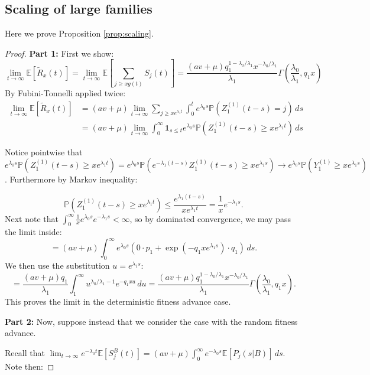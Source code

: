 \documentclass{article}
\numberwithin{equation}{section}
\begin{document}
\subsection{Scaling of large families}\label{app:scaling}
Here we prove Proposition \ref{prop:scaling}.
\Scaling*
\begin{proof}
    \textbf{Part 1: }First we show:
    \[\lim_{t\to\infty}\mathbb{E}\left[\widetilde{R}_x(t)\right]=\lim_{t\to\infty}\mathbb{E}\left[\sum_{j\geq xg(t)}S_j(t)\right]=\frac{(av+\mu) q_1^{1-\lambda_0/\lambda_1}x^{-\lambda_0/\lambda_1}}{\lambda_1}\Gamma(\frac{\lambda_0}{\lambda_1},q_1 x)\]
    By Fubini-Tonnelli applied twice:
  \begin{align*}
    \lim_{t\to\infty}\mathbb{E}[\widetilde{R}_x(t)]&=(av+\mu)\lim_{t\to\infty}\sum_{j\geq xe^{\lambda_1 t}}\int_0^t e^{\lambda_0 s}\mathbb{P}(Z_1^{(1)}(t-s)=j)\,ds\\
    &=(av+\mu)\lim_{t\to\infty}\int_0^\infty \mathbf{1}_{s\leq t} e^{\lambda_0 s}\mathbb{P}(Z_1^{(1)}(t-s)\geq xe^{\lambda_1 t})\,ds
  \end{align*}

Notice pointwise that $e^{\lambda_0 s} \mathbb{P}(Z_1^{(1)}(t-s)\geq x e^{\lambda_1 t})=e^{\lambda_0 s} \mathbb{P}(e^{-\lambda_1 (t-s)}Z_1^{(1)}(t-s)\geq x e^{\lambda_1 s})\to e^{\lambda_0 s}\mathbb{P}(Y_1^{(1)}\geq x e^{\lambda_1 s})$. Furthermore by Markov inequality:

\[\mathbb{P}(Z_1^{(1)}(t-s)\geq xe^{\lambda_1 t})\leq \frac{e^{\lambda_1(t-s)}}{x e^{\lambda_1 t}}=\frac{1}{x}e^{-\lambda_1 s}.\]
Next note that $\int_0^\infty \frac{1}{x}e^{\lambda_0 s}e^{-\lambda_1 s}<\infty$, so by dominated convergence, we may pass the limit inside:
\[
=(av+\mu)\int_0^\infty e^{\lambda_0 s}(0\cdot p_1+\exp(-q_1 xe^{\lambda_1 s})\cdot q_1)\,ds.
\]
We then use the substitution $u=e^{\lambda_1 s}$:
\[
=\frac{(av+\mu)q_1}{\lambda_1}\int_1^\infty u^{\lambda_0/\lambda_1-1}e^{-q_1 x u}\,du=\frac{(av+\mu) q_1^{1-\lambda_0/\lambda_1}x^{-\lambda_0/\lambda_1}}{\lambda_1}\Gamma(\frac{\lambda_0}{\lambda_1},q_1 x).
\]
This proves the limit in the deterministic fitness advance case.

\textbf{Part 2: }Now, suppose instead that we consider the case with the random fitness advance.

Recall that $\lim_{t\to\infty}e^{-\lambda_0t}\mathbb{E}[S_j^B(t)]=(av+\mu)\int_0^\infty e^{-\lambda_0 s}\mathbb{E}[P_j(s|B)]\,ds$. Note then:


\end{proof}
\end{document}
